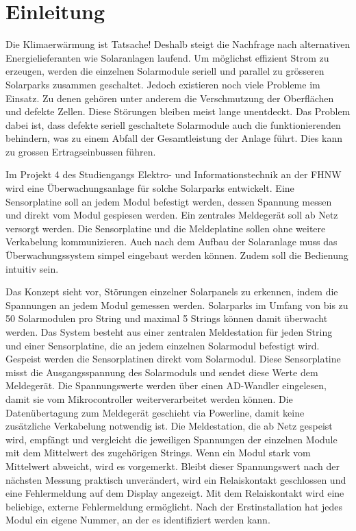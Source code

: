 \section{Einleitung}


Die Klimaerwärmung ist Tatsache! Deshalb steigt die Nachfrage nach alternativen Energielieferanten wie Solaranlagen laufend. Um möglichst effizient Strom zu erzeugen, werden die einzelnen Solarmodule seriell und parallel zu grösseren Solarparks zusammen geschaltet. Jedoch existieren noch viele Probleme im Einsatz. Zu denen gehören unter anderem die Verschmutzung der Oberflächen und defekte Zellen. Diese Störungen bleiben meist lange unentdeckt. Das Problem dabei ist, dass defekte seriell geschaltete Solarmodule auch die funktionierenden behindern, was zu einem Abfall der Gesamtleistung der Anlage führt. Dies kann zu grossen Ertragseinbussen führen.


Im Projekt 4 des Studiengangs Elektro- und Informationstechnik an der FHNW wird eine Überwachungsanlage für solche Solarparks entwickelt. Eine Sensorplatine soll an jedem Modul befestigt werden, dessen Spannung messen und direkt vom Modul gespiesen werden. Ein zentrales Meldegerät soll ab Netz versorgt werden. Die Sensorplatine und die Meldeplatine sollen ohne weitere Verkabelung kommunizieren. Auch nach dem Aufbau der Solaranlage muss das Überwachungssystem simpel eingebaut werden können. Zudem soll die Bedienung intuitiv sein.

Das Konzept sieht vor, Störungen einzelner Solarpanels zu erkennen, indem die Spannungen an jedem Modul gemessen werden. Solarparks im Umfang von bis zu 50 Solarmodulen pro String und maximal 5 Strings können damit überwacht werden. Das System besteht aus einer zentralen Meldestation für jeden String und einer Sensorplatine, die an jedem einzelnen Solarmodul befestigt wird. Gespeist werden die Sensorplatinen direkt vom Solarmodul. Diese Sensorplatine misst die Ausgangsspannung des Solarmoduls und sendet diese Werte dem Meldegerät. Die Spannungswerte werden über einen AD-Wandler eingelesen, damit sie vom Mikrocontroller weiterverarbeitet werden können. Die Datenübertagung zum Meldegerät geschieht via Powerline, damit keine zusätzliche Verkabelung notwendig ist. Die Meldestation, die ab Netz gespeist wird, empfängt und vergleicht die jeweiligen Spannungen der einzelnen Module mit dem Mittelwert des zugehörigen Strings. Wenn ein Modul stark vom Mittelwert abweicht, wird es vorgemerkt. Bleibt dieser Spannungswert nach der nächsten Messung praktisch unverändert, wird ein Relaiskontakt geschlossen und eine Fehlermeldung auf dem Display angezeigt. Mit dem Relaiskontakt wird eine beliebige, externe Fehlermeldung ermöglicht. Nach der Erstinstallation hat jedes Modul ein eigene Nummer, an der es identifiziert werden kann.

